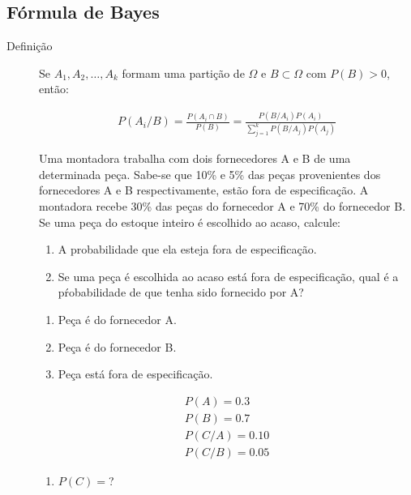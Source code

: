    \subsection{Fórmula de Bayes}
   \begin{description}
     \item [Definição] Se $A_1,A_2,\ldots, A_k$ formam uma partição de $\Omega$ e 
       $B \subset \Omega$ com $P(B)>0$, então:

       \begin{align}
         P(A_i/ B)= \frac{P(A_i \cap B)}{P(B)}         =\frac{P(B/A_i)P(A_i)}{\displaystyle{\sum \limits_{j=1}^k P(B/A_j)P(A_j)}}
       \end{align}

       \begin{example}
         Uma montadora trabalha com dois fornecedores A e B de uma determinada peça.
         Sabe-se que 10\% e 5\% das peças provenientes dos fornecedores A e B respectivamente,
         estão fora de especificação. A montadora recebe 30\% das peças do fornecedor A e 70\%
         do fornecedor B. Se uma peça do estoque inteiro é escolhido ao acaso, calcule:

         \begin{enumerate}[label=(\alph*)]
           \item A probabilidade que ela esteja fora de especificação.
           \item Se uma peça é escolhida ao acaso está fora de especificação, qual é a 
             pŕobabilidade de que tenha sido fornecido por A?
         \end{enumerate}
         \begin{enumerate}[label=\Alph*:]
           \item  Peça é do fornecedor A.
           \item  Peça é do fornecedor B.
           \item  Peça está fora de especificação.
         \end{enumerate}
         \begin{align*}
           P(A)= 0.3\\
           P(B)=0.7\\
           P(C/A)= 0.10\\
           P(C/B)= 0.05
         \end{align*}
         \begin{enumerate}[label=(\alph*)]
           \item $P(C)=$?


\end{enumerate}
\end{example}
\end{description}
